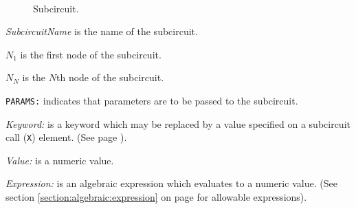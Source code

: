%
%
{}

%
%

\begin{figure}[h]
\centering
\ \epsfxsize=2in
\caption{Subcircuit.}
\end{figure}

{
}



\begin{widelist}
\item[{\it SubcircuitName}] is the name of the subcircuit.
\item[$N_1$] is the first node of the subcircuit.
\item[$N_N$] is the $N$th node of the subcircuit.
\item[{\tt PARAMS:}] indicates that parameters are to be passed to
the subcircuit.
\item[{\it Keyword:}] is a keyword which may be replaced by a value
specified on a subcircuit call ({\tt X}) element.
(See page \pageref{Xelement}).
\item[{\it Value:}] is a numeric value.
\item[{\it Expression:}] is an algebraic expression which evaluates to a numeric
value.
(See section \ref{section:algebraic:expression}
on page \pageref{section:algebraic:expression} for allowable expressions).
\end{widelist}

